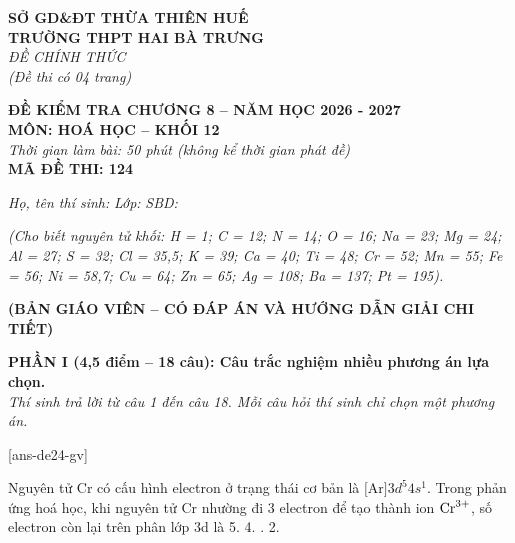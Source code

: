\documentclass[11pt,a4paper]{article}
\begin{document}
\begin{minipage}[t]{0.45\textwidth}
\textbf{SỞ GD\&ĐT THỪA THIÊN HUẾ}\\
\textbf{TRƯỜNG THPT HAI BÀ TRƯNG}\\
\textit{ĐỀ CHÍNH THỨC}\\
\textit{(Đề thi có 04 trang)}
\end{minipage}
\hfill
\begin{minipage}[t]{0.52\textwidth}
\raggedleft
\textbf{\color{hfRed}ĐỀ KIỂM TRA CHƯƠNG 8 -- NĂM HỌC 2026 - 2027}\\
\textbf{MÔN: HOÁ HỌC -- KHỐI 12}\\
\textit{Thời gian làm bài: 50 phút (không kể thời gian phát đề)}\\
\textbf{MÃ ĐỀ THI: 124}
\end{minipage}

\vspace{2pt}
\noindent
\textit{Họ, tên thí sinh:} \dotfill \textit{Lớp:} \dotfill \textit{SBD:} \dotfill

\vspace{1pt}
\noindent
\textit{\footnotesize (Cho biết nguyên tử khối: H = 1; C = 12; N = 14; O = 16; Na = 23; Mg = 24; Al = 27; S = 32; Cl = 35,5; K = 39; Ca = 40; Ti = 48; Cr = 52; Mn = 55; Fe = 56; Ni = 58,7; Cu = 64; Zn = 65; Ag = 108; Ba = 137; Pt = 195).}

\vspace{2pt}
\begin{center}
\textbf{\color{hfRed}\large (BẢN GIÁO VIÊN -- CÓ ĐÁP ÁN VÀ HƯỚNG DẪN GIẢI CHI TIẾT)}
\end{center}

\vspace{2pt}
\noindent
\textbf{PHẦN I (4,5 điểm -- 18 câu): Câu trắc nghiệm nhiều phương án lựa chọn.}\\
\textit{Thí sinh trả lời từ câu 1 đến câu 18. Mỗi câu hỏi thí sinh chỉ chọn một phương án.}

[ans-de24-gv]

\begin{ex}
 Nguyên tử Cr có cấu hình electron ở trạng thái cơ bản là $\text{[Ar]}3d^5 4s^1$. Trong phản ứng hoá học, khi nguyên tử Cr nhường đi 3 electron để tạo thành ion $\ce{Cr^3+}$, số electron còn lại trên phân lớp 3d là
\choice
{5.}
{4.}
{.}
{2.}
\end{ex}
\end{document}
